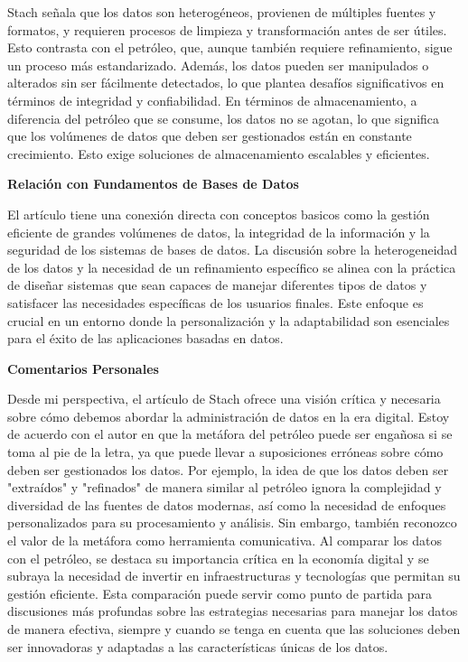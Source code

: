 Stach señala que los datos son heterogéneos, provienen de múltiples fuentes y formatos, y requieren procesos de limpieza y transformación antes de ser útiles. Esto contrasta con el petróleo, que, aunque también requiere refinamiento, sigue un proceso más estandarizado. Además, los datos pueden ser manipulados o alterados sin ser fácilmente detectados, lo que plantea desafíos significativos en términos de integridad y confiabilidad. En términos de almacenamiento, a diferencia del petróleo que se consume, los datos no se agotan, lo que significa que los volúmenes de datos que deben ser gestionados están en constante crecimiento. Esto exige soluciones de almacenamiento escalables y eficientes.

\textbf{Relación con Fundamentos de Bases de Datos}

El artículo tiene una conexión directa con conceptos basicos como la gestión eficiente de grandes volúmenes de datos, la integridad de la información y la seguridad de los sistemas de bases de datos. La discusión sobre la heterogeneidad de los datos y la necesidad de un refinamiento específico se alinea con la práctica de diseñar sistemas que sean capaces de manejar diferentes tipos de datos y satisfacer las necesidades específicas de los usuarios finales. Este enfoque es crucial en un entorno donde la personalización y la adaptabilidad son esenciales para el éxito de las aplicaciones basadas en datos.

\textbf{Comentarios Personales}

Desde mi perspectiva, el artículo de Stach ofrece una visión crítica y necesaria sobre cómo debemos abordar la administración de datos en la era digital. Estoy de acuerdo con el autor en que la metáfora del petróleo puede ser engañosa si se toma al pie de la letra, ya que puede llevar a suposiciones erróneas sobre cómo deben ser gestionados los datos. Por ejemplo, la idea de que los datos deben ser "extraídos" y "refinados" de manera similar al petróleo ignora la complejidad y diversidad de las fuentes de datos modernas, así como la necesidad de enfoques personalizados para su procesamiento y análisis. Sin embargo, también reconozco el valor de la metáfora como herramienta comunicativa. Al comparar los datos con el petróleo, se destaca su importancia crítica en la economía digital y se subraya la necesidad de invertir en infraestructuras y tecnologías que permitan su gestión eficiente. Esta comparación puede servir como punto de partida para discusiones más profundas sobre las estrategias necesarias para manejar los datos de manera efectiva, siempre y cuando se tenga en cuenta que las soluciones deben ser innovadoras y adaptadas a las características únicas de los datos.

